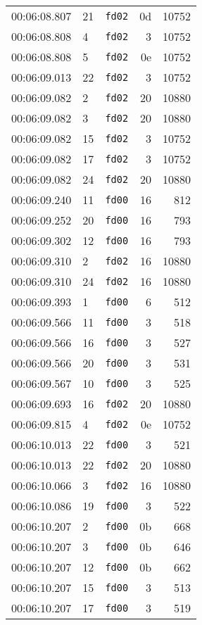 \documentclass{article}
\begin{document}
\begin{longtable}{lllrr}
00:06:08.807 & 21 & \texttt{fd02} & 0d & 10752 \\
00:06:08.808 & 4 & \texttt{fd02} & 3 & 10752 \\
00:06:08.808 & 5 & \texttt{fd02} & 0e & 10752 \\
00:06:09.013 & 22 & \texttt{fd02} & 3 & 10752 \\
00:06:09.082 & 2 & \texttt{fd02} & 20 & 10880 \\
00:06:09.082 & 3 & \texttt{fd02} & 20 & 10880 \\
00:06:09.082 & 15 & \texttt{fd02} & 3 & 10752 \\
00:06:09.082 & 17 & \texttt{fd02} & 3 & 10752 \\
00:06:09.082 & 24 & \texttt{fd02} & 20 & 10880 \\
00:06:09.240 & 11 & \texttt{fd00} & 16 & 812 \\
00:06:09.252 & 20 & \texttt{fd00} & 16 & 793 \\
00:06:09.302 & 12 & \texttt{fd00} & 16 & 793 \\
00:06:09.310 & 2 & \texttt{fd02} & 16 & 10880 \\
00:06:09.310 & 24 & \texttt{fd02} & 16 & 10880 \\
00:06:09.393 & 1 & \texttt{fd00} & 6 & 512 \\
00:06:09.566 & 11 & \texttt{fd00} & 3 & 518 \\
00:06:09.566 & 16 & \texttt{fd00} & 3 & 527 \\
00:06:09.566 & 20 & \texttt{fd00} & 3 & 531 \\
00:06:09.567 & 10 & \texttt{fd00} & 3 & 525 \\
00:06:09.693 & 16 & \texttt{fd02} & 20 & 10880 \\
00:06:09.815 & 4 & \texttt{fd02} & 0e & 10752 \\
00:06:10.013 & 22 & \texttt{fd00} & 3 & 521 \\
00:06:10.013 & 22 & \texttt{fd02} & 20 & 10880 \\
00:06:10.066 & 3 & \texttt{fd02} & 16 & 10880 \\
00:06:10.086 & 19 & \texttt{fd00} & 3 & 522 \\
00:06:10.207 & 2 & \texttt{fd00} & 0b & 668 \\
00:06:10.207 & 3 & \texttt{fd00} & 0b & 646 \\
00:06:10.207 & 12 & \texttt{fd00} & 0b & 662 \\
00:06:10.207 & 15 & \texttt{fd00} & 3 & 513 \\
00:06:10.207 & 17 & \texttt{fd00} & 3 & 519 \\

\end{longtable}
\end{document}
